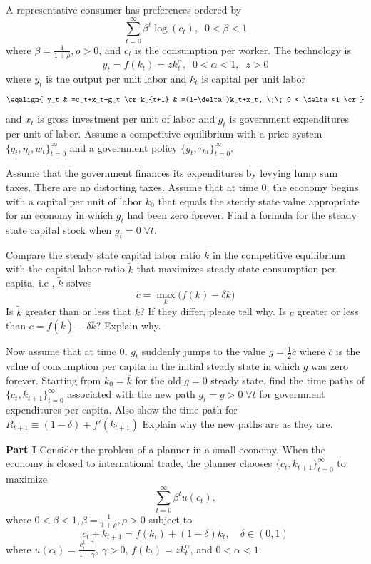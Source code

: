 \medskip
{}
\medskip
\noindent
 A representative consumer has preferences ordered by
 $$ \sum_{t=0}^\infty \beta^t \log(c_t), \;\;  0< \beta<1$$
 where $\beta = {\frac{1}{1+\rho}}, \rho>0$, and $c_t$ is the consumption per worker.
The technology is $$ y_t=f(k_t)=zk_t^\alpha, \;\; 0<\alpha<1, \;\; z>0 $$
where $y_t$ is the output per unit labor and $k_t$ is capital per unit labor
$$\eqalign{
y_t & =c_t+x_t+g_t \cr
  k_{t+1} & =(1-\delta)k_t+x_t, \;\;  0 < \delta<1 \cr
}$$
and $x_t$ is  gross investment per unit of labor and $g_t$ is  government expenditures per unit of labor.
Assume a competitive equilibrium with a price system $\{q_t,\eta_t,w_t\}_{t=0}^\infty$ and a government policy $\{g_t,\tau_{ht}\}_{t=0}^\infty$.

 Assume that the government finances its expenditures by levying lump sum taxes. There are no distorting taxes. Assume that at time 0, the economy begins
 with a capital per unit of labor $k_0$ that equals the steady state value appropriate for an economy in which $g_t$ had been zero forever.
\medskip
{} Find a formula for the steady state capital stock when $g_t=0 \; \forall t$.
\medskip

 Compare the steady state capital labor ratio $\overline{k}$ in the competitive equilibrium with the capital labor ratio $\tilde{k}$ that maximizes steady state consumption per capita, i.e , $\tilde{k}$ solves $$\tilde{c}=\max_k \bigl( f(k)-\delta k \bigr)$$
Is $\tilde{k}$ greater than or less that $\overline{k}$? If they differ, please tell why. Is $\tilde{c}$ greater or less than $\overline{c} = f(\overline{k})-\delta  \overline{k}$? Explain why.
\medskip

 Now assume that at time 0, $g_t$ suddenly jumps to the value $g={\frac{1}{2}}\overline{c}$ where
$\overline{c}$ is the value of consumption per capita in the initial steady state in which $g$ was zero forever. Starting from $k_0 = \overline{k}$ for the old $g=0$ steady state, find the time paths of $\{c_t,k_{t+1}\}_{t=0}^\infty$ associated with the new path $g_t=g>0 \; \forall t$ for government expenditures per capita.
Also show the time path for $\bar R_{t+1} \equiv (1-\delta) + f'(k_{t+1})$
Explain why the new paths are as they are.


\medskip
{}  \medskip
\medskip
\noindent
{\bf Part  I}
\medskip \noindent
Consider the problem of a planner in a small economy. When the economy is closed to international trade, the planner chooses $\{c_t,k_{t+1}\}_{t=0}^\infty$ to maximize
$$ \sum_{t=0}^\infty \beta^t u(c_t), $$
where $ 0< \beta<1, \beta = {\frac{1}{1+\rho}}, \rho>0$
subject to
$$c_t+k_{t+1}=f(k_t)+(1-\delta)k_t,  \quad  \delta \in (0,1)$$
\noindent where $u(c_t)={\frac{c_t^{1-\gamma}}{1-\gamma}}$, $\gamma>0$, $f(k_t)=zk_t^\alpha$, and $0<\alpha<1$.


